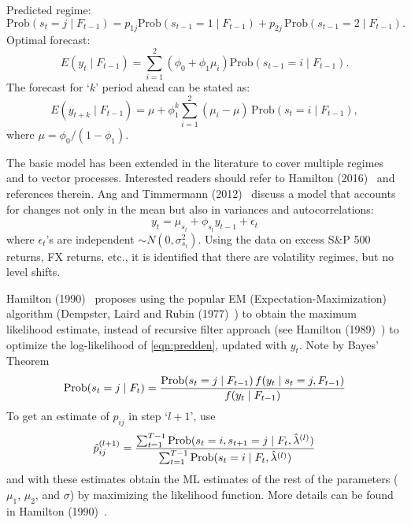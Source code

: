 \noindent Predicted regime: 
	\begin{equation} \label{eqn:predreg}
	\text{Prob}(s_t= j \;|\; F_{t-1})= p_{1j} \text{Prob}(s_{t-1}=1 \;|\; F_{t-1}) + p_{2j} \,\text{Prob}(s_{t-1}=2 \;|\; F_{t-1}).
	\end{equation}
\noindent Optimal forecast:
	\begin{equation} \label{eqn:optfore}
	E(y_t \;|\; F_{t-1})= \sum_{i=1}^2 (\phi_0+\phi_1 \mu_i) \text{Prob}(s_{t-1}=i \;|\; F_{t-1}).
	\end{equation}
The forecast for `$k$' period ahead can be stated as:
	\begin{equation} \label{eqn:period}
	E(y_{t+k} \;|\; F_{t-1}) = \mu+\phi_1^k \sum_{i=1}^2 (\mu_i-\mu)\, \text{Prob}(s_t=i \;|\; F_{t-1}),
	\end{equation}
where $\mu=\phi_0/(1-\phi_1)$.


The basic model has been extended in the literature to cover multiple regimes and to vector processes. Interested readers should refer to Hamilton (2016)~\cite{jdham} and references therein. Ang and Timmermann (2012)~\cite{timmerman} discuss a model that accounts for changes not only in the mean but also in variances and autocorrelations:
	\begin{equation} \label{eqn:varautoy}
	y_t= \mu_{s_t} + \phi_{s_t} y_{t-1} + \epsilon_t
	\end{equation}
where $\epsilon_t$'s are independent $\sim N(0,\sigma_{s_t}^2)$. Using the data on excess S\&P 500 returns, FX returns, etc., it is identified that there are volatility regimes, but no level shifts.


Hamilton (1990)~\cite{90ham} proposes using the popular EM (Expectation-Maximization) algorithm (Dempster, Laird and Rubin (1977)~\cite{dempster}) to obtain the maximum likelihood estimate, instead of recursive filter approach (see Hamilton (1989)~\cite{89ham}) to optimize the log-likelihood of \eqref{eqn:predden}, updated with $y_t$. Note by Bayes' Theorem
	\begin{equation} \label{eqn:bayes}
	\Prob(s_t= j \;|\; F_t) = \dfrac{\Prob(s_t= j \;|\; F_{t-1}) \, f(y_t\;|\; s_t=j, F_{t-1})}{f(y_t \;|\; F_{t-1})}
	\end{equation}
To get an estimate of $p_{ij}$ in step `$l+1$', use 
	\begin{equation}\label{eqn:hatpijl}
	\hat{p}_{ij}^{(l+1)}= \dfrac{\sum_{t=1}^{T-1} \Prob(s_t= i, s_{t+1}= j \;|\; F_t, \hat{\lambda}^{(l)})}{\sum_{t=1}^{T-1} \Prob(s_t= i \;|\; F_t, \hat{\lambda}^{(l)})}
	\end{equation}
and with these estimates obtain the ML estimates of the rest of the parameters ($\mu_1$, $\mu_2$, and $\sigma$) by maximizing the likelihood function. More details can be found in Hamilton (1990)~\cite{90ham}.


